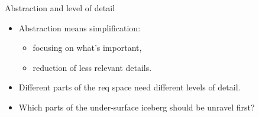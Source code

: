 \begin{Slide}{Abstraction and level of detail}
\begin{minipage}[t]{0.6\textwidth}
\begin{itemize}
\begin{itemize}
\end{itemize}
\item Abstraction means simplification:
\begin{itemize}
\item focusing on what's important,
\item reduction of less relevant details.
\end{itemize}
\item Different parts of the req space need different levels of detail.
\item Which parts of the under-surface iceberg should be unravel first?
\end{itemize}
\end{minipage}%

\end{Slide}
